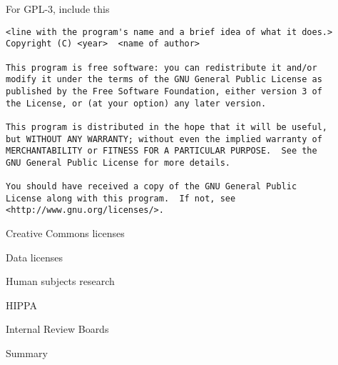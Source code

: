 \documentclass[12pt,t]{beamer}
\begin{document}
\begin{frame}[c,fragile]{For GPL-3, include this}

\begin{lstlisting}
<line with the program's name and a brief idea of what it does.>
Copyright (C) <year>  <name of author>

This program is free software: you can redistribute it and/or
modify it under the terms of the GNU General Public License as 
published by the Free Software Foundation, either version 3 of
the License, or (at your option) any later version.

This program is distributed in the hope that it will be useful,
but WITHOUT ANY WARRANTY; without even the implied warranty of
MERCHANTABILITY or FITNESS FOR A PARTICULAR PURPOSE.  See the
GNU General Public License for more details.

You should have received a copy of the GNU General Public
License along with this program.  If not, see
<http://www.gnu.org/licenses/>.
\end{lstlisting}

\end{frame}


\begin{frame}{Creative Commons licenses}

\note{

}
\end{frame}


\begin{frame}{Data licenses}

\note{
}
\end{frame}


\begin{frame}{Human subjects research}

\note{
}
\end{frame}


\begin{frame}{HIPPA}

\note{
}
\end{frame}


\begin{frame}{Internal Review Boards}

\note{
}
\end{frame}


\begin{frame}{Summary}

\note{
}
\end{frame}
\end{document}
